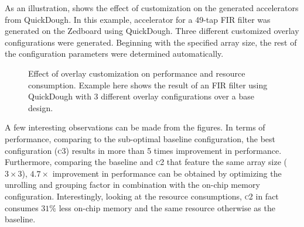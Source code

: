 As an illustration,  shows the effect of customization on the generated accelerators from QuickDough.
In this example, accelerator for a 49-tap FIR filter was generated on the Zedboard using QuickDough.
Three different customized overlay configurations were generated.
Beginning with the specified array size, the rest of the configuration parameters were determined automatically. 


\begin{figure}
\centering
{}
\hfill
{}
\newline
{}
\caption{Effect of overlay customization on performance and resource consumption.  Example here shows the result of an FIR filter using QuickDough with 3 different overlay configurations over a base design.}
\label{fig:qd_customization_fir}
\end{figure}

A few interesting observations can be made from the figures.  In terms of performance, comparing to the sub-optimal baseline configuration, the best configuration (\textsc{c3}) results in more than 5 times improvement in performance.
Furthermore, comparing the baseline and \textsc{c2} that feature the same array size ($3\times 3$), $4.7\times$ improvement in performance can be obtained by optimizing the unrolling and grouping factor in combination with the on-chip memory configuration.
Interestingly, looking at the resource consumptions, \textsc{c2} in fact consumes $31\%$ less on-chip memory and the same resource otherwise as the baseline.

